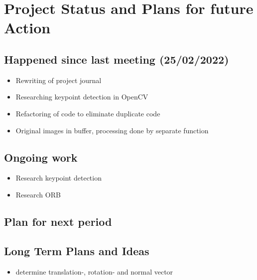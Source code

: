 \chapter{Project Status and Plans for future Action}

\section{Happened since last meeting (25/02/2022)}
\begin{itemize}
    \item Rewriting of project journal
    \item Researching keypoint detection in OpenCV
    \item Refactoring of code to eliminate duplicate code
    \item Original images in buffer, processing done by separate function
\end{itemize}
\section{Ongoing work}
\begin{itemize}
    \item Research keypoint detection
    \item Research ORB
\end{itemize}
\section{Plan for next period}

\section{Long Term Plans and Ideas}
\begin{itemize}
    \item determine translation-, rotation- and normal vector
\end{itemize}
